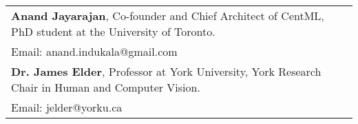\begin{tabularx}{\textwidth}{ @{}l r@{} }
    \textbf{Anand Jayarajan}, Co-founder and Chief Architect of CentML,   PhD student at the University of Toronto. \\
    Email: anand.indukala@gmail.com \\[10pt]
    \textbf{Dr. James Elder}, Professor at York University,   York Research Chair in Human and Computer Vision. \\
    Email: jelder@yorku.ca 
\end{tabularx}